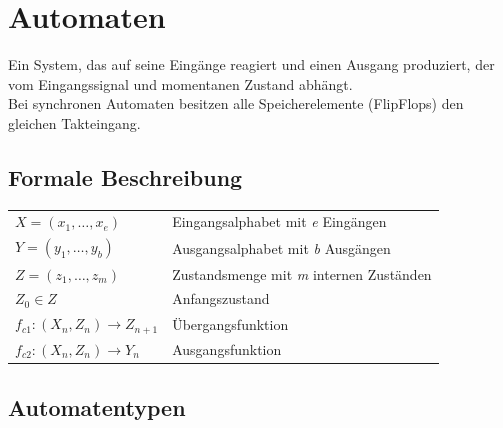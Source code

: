 \section{Automaten}
Ein System, das auf seine Eingänge reagiert und einen Ausgang produziert, der vom Eingangssignal und momentanen Zustand abhängt.\\
Bei synchronen Automaten besitzen alle Speicherelemente (FlipFlops) den gleichen Takteingang.

\subsection{Formale Beschreibung}
\begin{flushleft}
    \small
    \begin{tabular}{l p{33.5mm}}
        $X = (x_1, \dots, x_e)$ & Eingangsalphabet mit \emph{e} Eingängen\\
        $Y = (y_1, \dots, y_b)$ & Ausgangsalphabet mit \emph{b} Ausgängen\\
        $Z = (z_1, \dots, z_m)$ & Zustandsmenge mit \emph{m} internen Zuständen\\
        $Z_0 \in Z$ & Anfangszustand\\
        $f_{c1}:(X_n, Z_n) \rightarrow Z_{n+1}$ & Übergangsfunktion\\
        $f_{c2}:(X_n, Z_n) \rightarrow Y_n$ & Ausgangsfunktion
    \end{tabular}
\end{flushleft}
\subsection{Automatentypen}
